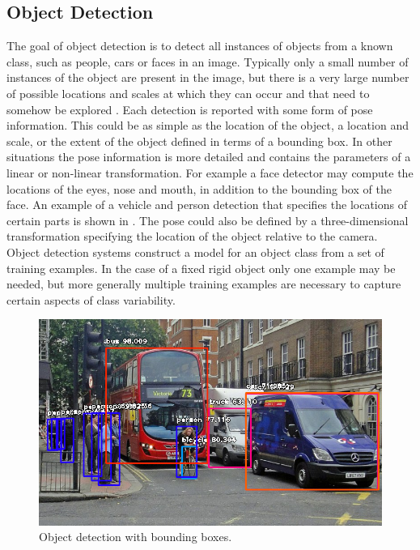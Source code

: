 \subsection{Object Detection}\label{s:patt-dtct}
The goal of object detection is to detect all instances of objects from a known
class, such as people, cars or faces in an image. Typically only a small number
of instances of the object are present in the image, but there is a very large
number of possible locations and scales at which they can occur and that need
to somehow be explored \cite{chavan2016object}.
Each detection is reported with some form of pose information. This could
be as simple as the location of the object, a location and scale, or the extent
of the object defined in terms of a bounding box. In other situations the pose
information is more detailed and contains the parameters of a linear or non-linear
transformation. For example a face detector may compute the locations of the
eyes, nose and mouth, in addition to the bounding box of the face. An example
of a vehicle and person detection that specifies the locations of certain parts is shown in
. The pose could also be defined by a three-dimensional transformation
specifying the location of the object relative to the camera.
Object detection systems construct a model for an object class from a set of
training examples. In the case of a fixed rigid object only one example may be
needed, but more generally multiple training examples are necessary to capture
certain aspects of class variability.
\begin{figure}[H]
	\centering
	\includegraphics[width=0.5\linewidth]{images/object_det.jpeg}
	\caption{Object detection with bounding boxes.}
	\label{f:patt-dtct}
\end{figure}


